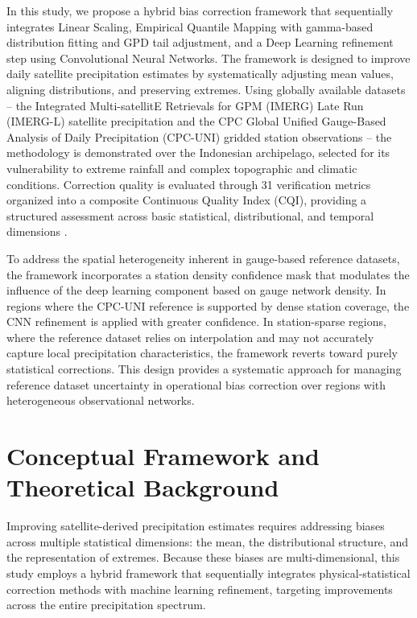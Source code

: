 \documentclass[remotesensing,article,submit,pdftex,moreauthors]{Definitions/mdpi}
\begin{document}
In this study, we propose a hybrid bias correction framework that
sequentially integrates Linear Scaling, Empirical Quantile Mapping with
gamma-based distribution fitting and GPD tail adjustment, and a Deep
Learning refinement step using Convolutional Neural Networks. The
framework is designed to improve daily satellite precipitation estimates
by systematically adjusting mean values, aligning distributions, and
preserving extremes. Using globally available datasets -- the Integrated
Multi-satellitE Retrievals for GPM (IMERG) Late Run (IMERG-L) satellite
precipitation \cite{ref2} and the CPC Global Unified Gauge-Based Analysis of
Daily Precipitation (CPC-UNI) gridded station observations \cite{ref13} --
the methodology is demonstrated over the Indonesian archipelago,
selected for its vulnerability to extreme rainfall and complex
topographic and climatic conditions. Correction quality is evaluated
through 31 verification metrics organized into a composite Continuous
Quality Index (CQI), providing a structured assessment across basic
statistical, distributional, and temporal dimensions \cite{ref14,ref15}.

To address the spatial heterogeneity inherent in gauge-based reference
datasets, the framework incorporates a station density confidence mask
that modulates the influence of the deep learning component based on
gauge network density. In regions where the CPC-UNI reference is
supported by dense station coverage, the CNN refinement is applied with
greater confidence. In station-sparse regions, where the reference
dataset relies on interpolation and may not accurately capture local
precipitation characteristics, the framework reverts toward purely
statistical corrections. This design provides a systematic approach for
managing reference dataset uncertainty in operational bias correction
over regions with heterogeneous observational networks.

\section{Conceptual Framework and Theoretical Background}

Improving satellite-derived precipitation estimates requires addressing
biases across multiple statistical dimensions: the mean, the
distributional structure, and the representation of extremes. Because
these biases are multi-dimensional, this study employs a hybrid
framework that sequentially integrates physical-statistical correction
methods with machine learning refinement, targeting improvements across
the entire precipitation spectrum.
\end{document}
